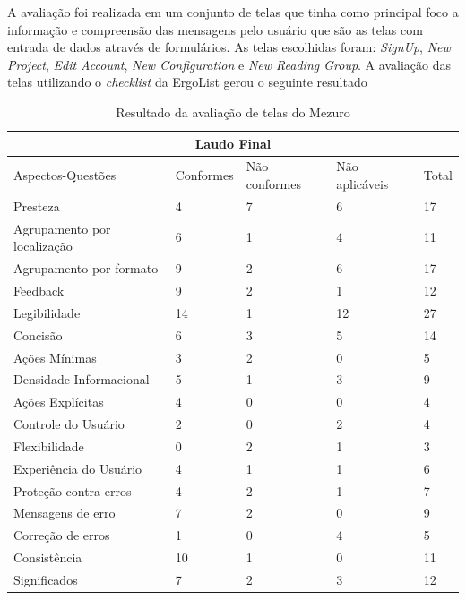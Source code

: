 A avaliação foi realizada em um conjunto de telas que tinha como principal foco a informação e compreensão das mensagens pelo usuário que são as telas com entrada de dados através de formulários. As telas escolhidas foram: \textit{SignUp}, \textit{New Project}, \textit{Edit Account}, \textit{New Configuration} e \textit{New Reading Group}. A avaliação das telas utilizando o \textit{checklist} da ErgoList gerou o seguinte resultado

\begin{table}[h]
\begin{tabular}{|l|l|l|l|l|}
\hline
\multicolumn{5}{c}{\textbf{Laudo Final}}                                         \\ \hline
Aspectos-Questões           & Conformes & Não conformes & Não aplicáveis & Total \\ \hline
Presteza                    & 4         & 7             & 6              & 17    \\ \hline
Agrupamento por localização & 6         & 1             & 4              & 11    \\ \hline
Agrupamento por formato     & 9         & 2             & 6              & 17    \\ \hline
Feedback                    & 9         & 2             & 1              & 12    \\ \hline
Legibilidade                & 14        & 1             & 12             & 27    \\ \hline
Concisão                    & 6         & 3             & 5              & 14    \\ \hline
Ações Mínimas               & 3         & 2             & 0              & 5     \\ \hline
Densidade Informacional     & 5         & 1             & 3              & 9     \\ \hline
Ações Explícitas            & 4         & 0             & 0              & 4     \\ \hline
Controle do Usuário         & 2         & 0             & 2              & 4     \\ \hline
Flexibilidade               & 0         & 2             & 1              & 3     \\ \hline
Experiência do Usuário      & 4         & 1             & 1              & 6     \\ \hline
Proteção contra erros       & 4         & 2             & 1              & 7     \\ \hline
Mensagens de erro           & 7         & 2             & 0              & 9     \\ \hline
Correção de erros           & 1         & 0             & 4              & 5     \\ \hline
Consistência                & 10        & 1             & 0              & 11    \\ \hline
Significados                & 7         & 2             & 3              & 12    \\ \hline
\end{tabular}
\caption{Resultado da avaliação de telas do Mezuro}
\end{table}

